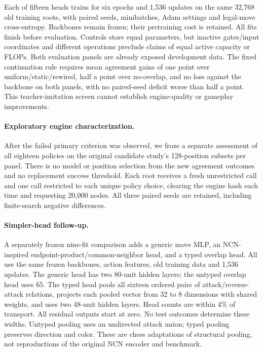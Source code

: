 Each of fifteen heads trains for six epochs and 1,536 updates on the same
32,768 old training roots, with paired seeds, minibatches, Adam settings and
legal-move cross-entropy. Backbones remain frozen; their pretraining cost is
retained. All fits finish before evaluation. Controls store equal parameters,
but inactive gates/input coordinates and different operations preclude claims
of equal active capacity or FLOPs. Both evaluation panels are already exposed
development data. The fixed continuation rule requires mean agreement gains
of one point over uniform/static/rewired, half a point over no-overlap, and no
loss against the backbone on both panels, with no paired-seed deficit worse
than half a point. This teacher-imitation screen cannot establish engine-quality
or gameplay improvements.


\TransportResults{}

\paragraph{Exploratory engine characterization.}
After the failed primary criterion was observed, we froze a separate assessment
of all eighteen policies on the original candidate study's 128-position subsets
per panel. There is no model or position selection from the new agreement
outcomes and no replacement success threshold. Each root receives a fresh
unrestricted call and one call restricted to each unique policy choice, clearing
the engine hash each time and requesting 20,000 nodes. All three paired seeds
are retained, including finite-search negative differences.

\TransportRegretResults{}

\paragraph{Simpler-head follow-up.}
A separately frozen nine-fit comparison adds a generic move MLP, an NCN-inspired
endpoint-product/common-neighbor head, and a typed overlap head. All use the
same frozen backbones, action features, old training data and 1,536 updates.
The generic head has two 80-unit hidden layers; the untyped overlap head uses
65. The typed head pools all sixteen ordered pairs of attack/reverse-attack
relations, projects each pooled vector from 32 to 8 dimensions with shared
weights, and uses two 48-unit hidden layers. Head counts are within 4\% of
transport. All residual outputs start at zero. No test outcomes determine
these widths. Untyped pooling uses an undirected attack union; typed pooling
preserves direction and color. These are chess adaptations of structural
pooling, not reproductions of the original NCN encoder and benchmark.

